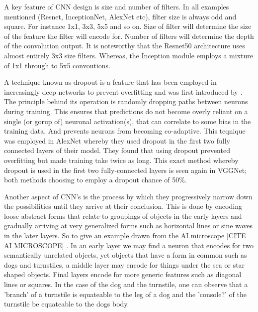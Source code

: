   \par
  A key feature of CNN design is size and number of filters. In all examples mentioned (Resnet, InceptionNet, AlexNet etc), filter size is always odd and square. For instance 1x1, 3x3, 5x5 and so on. Size of filter will determine the size of the feature the filter will encode for. Number of filters will determine the depth of the convolution output. It is noteworthy that the Resnet50 architecture \cite{He} uses almost entirely 3x3 size filters. Whereas, the Inception module employs a mixture of 1x1 through to 5x5 convoutions.
  \par
  A technique known as dropout is a feature that has been employed in increasingly deep networks to prevent overfitting and was first introduced by \cite{Srivastava2014}. The principle behind its operation is randomly dropping paths between neurons during training. This ensures that predictions do not become overly reliant on a single (or gorup of) neuronal activation(s), that can correlate to some bias in the training data. And prevents neurons from becoming co-adaptive. This teqnique was employed in AlexNet \cite{Krizhevsky} whereby they used dropout in the first two fully connected layers of their model. They found that using dropout prevented overfitting but made training take twice as long. This exact method whereby dropout is used in the first two fully-connected layers is seen again in VGGNet\cite{Simonyan2015}; both methods choosing to employ a dropout chance of 50\%. %
  \par
  Another aspect of CNN's is the process by which they progressively narrow down the possibilities until they arrive at their conclusion. This is done by encoding loose abstract forms that relate to groupings of objects in the early layers and gradually arriving at very generalized forms such as horizontal lines or sine waves in the later layers. So to give an example drawn from the AI microscope [CITE AI MICROSCOPE] . In an early layer  we may find a neuron that encodes for two semantically unrelated objects, yet objects that have a form in common such as dogs and turnstiles, a middle layer may encode for things under the sea or star shaped objects. Final layers encode for more generic features such as diagonal lines or squares. In the case of the dog and the turnstile, one can observe that a 'branch' of a turnstile is equateable to the leg of a dog and the 'console?' of the turnstile be equateable to the dogs body.
  \par

